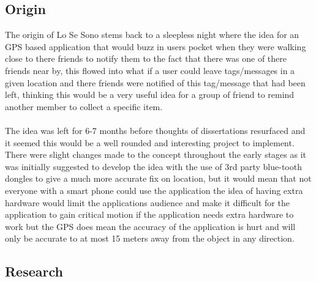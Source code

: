 \subsection{Origin}

The origin of Lo Se Sono stems back to a sleepless night where the idea for an GPS based application that would buzz in users pocket when they were walking close to there friends to notify them to the fact that there was one of there friends near by, this flowed into what if a user could leave tags/messages in a given location and there friends were notified of this tag/message that had been left, thinking this would be a very useful idea for a group of friend to remind another member to collect a specific item.\\
\\
The idea was left for 6-7 months before thoughts of dissertations resurfaced and it seemed this would be a well rounded and interesting project to implement. There were slight changes made to the concept throughout the early stages as it was initially suggested to develop the idea with the use of 3rd party blue-tooth dongles to give a much more accurate fix on location, but it would mean that not everyone with a smart phone could use the application the idea of having extra hardware would limit the applications audience and make it difficult for the application to gain critical motion if the application needs extra hardware to work but the GPS does mean the accuracy of the application is hurt and will only be accurate to at most 15 meters away from the object in any direction.

\subsection{Research}

